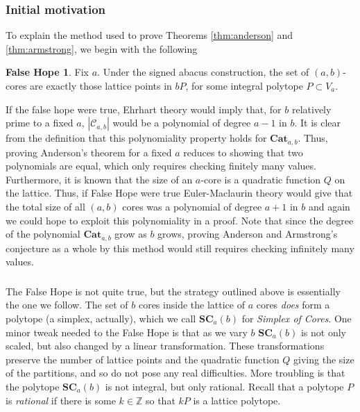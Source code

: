 \documentclass{amsart}[12pt]
\theoremstyle{definition}
\newtheorem{FalseHope}{False Hope}
\newcommand{\Z}{\mathbb{Z}}
\newcommand{\SC}{\mathbf{SC}}
\newcommand{\Cat}{\mathbf{Cat}}
\begin{document}
\subsubsection{Initial motivation}
To explain the method used to prove Theorems \ref{thm:anderson} and \ref{thm:armstrong}, we begin with the following
\begin{FalseHope}
Fix $a$. Under the signed abacus construction, the set of $(a,b)$-cores are exactly those lattice points in $bP$, for some integral polytope $P\subset V_a$.
\end{FalseHope}
If the false hope were true, Ehrhart theory would imply that, for $b$ relatively prime to a fixed $a$, $|\mathcal{C}_{a,b}|$ would be a polynomial of degree $a-1$ in $b$. It is clear from the definition that this polynomiality property holds for $\Cat_{a,b}$. Thus, proving Anderson's theorem for a fixed $a$ reduces to showing that two polynomials are equal, which only requires checking finitely many values.
Furthermore, it is known that the size of an $a$-core is a quadratic function $Q$ on the lattice. Thus, if False Hope were true Euler-Maclaurin theory would give that the total size of all $(a,b)$ cores was a polynomial of degree $a+1$ in $b$ and again we could hope to exploit this polynomiality in a proof.
Note that since the degree of the polynomial $\Cat_{a,b}$ grow as $b$ grows, proving Anderson and Armstrong's conjecture as a whole by this method would still requires checking infinitely many values.
\subsubsection{}
The False Hope is not quite true, but the strategy outlined above is essentially the one we follow. The set of $b$ cores inside the lattice of $a$ cores \emph{does} form a polytope (a simplex, actually), which we call $\SC_a(b)$ for \emph{Simplex of Cores}.
One minor tweak needed to the False Hope is that as we vary $b$ $\SC_a(b)$ is not only scaled, but also changed by a linear transformation. These transformations preserve the number of lattice points and the quadratic function $Q$ giving the size of the partitions, and so do not pose any real difficulties.
More troubling is that the polytope $\SC_{a}(b)$ is not integral, but only rational. Recall that a polytope $P$ is \emph{rational} if there is some $k\in\Z$ so that $kP$ is a lattice polytope.
\end{document}
